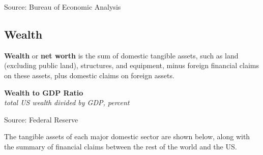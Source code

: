 \documentclass{report}
\makeatletter
\newcommand{\tbllink}[1]{\href{https://raw.githubusercontent.com/bdecon/US-chartbook/master/chartbook/data/#1}{\faTable}}
\newcommand*\short[1]{\expandafter\@gobbletwo\number\numexpr#1\relax}
\newcommand{\sbar}[4]{
		\addplot[ybar stacked, bar width=2.3pt, draw opacity=0, fill=#1] 
			table [x=#2, y=#3, col sep=comma]{#4};}
\newcommand{\absnode}[3]{\node[below right, align=left] at (axis cs: #1,#2) {#3};}
\newcommand{\dateaxisticks}{
		date coordinates in=x, axis line style={draw=none},
		xmax={2023-10-01},
		max space between ticks=40,	    
		xtick={{1990-01-01}, {1992-01-01}, {1994-01-01}, 
			{1996-01-01}, {1998-01-01}, {2000-01-01}, 
			{2002-01-01}, {2004-01-01}, {2006-01-01},
			{2008-01-01}, {2010-01-01}, {2012-01-01}, {2014-01-01},
		    {2016-01-01}, {2018-01-01}, {2020-01-01}, {2022-01-01}, 
		    {2024-01-01}, {2026-01-01}},
		minor xtick={{1989-01-01}, {1991-01-01}, {1993-01-01},
			{1995-01-01}, {1997-01-01}, {1999-01-01}, 
			{2001-01-01}, {2003-01-01}, {2005-01-01}, {2007-01-01},
		    {2009-01-01}, {2011-01-01}, {2013-01-01}, {2015-01-01},
		    {2017-01-01}, {2019-01-01}, {2021-01-01}, {2023-01-01}, 
		    {2025-01-01}, {2027-01-01}},
		enlarge y limits={0.06}, enlarge x limits={0.01},
		}
\newcommand{\bbar}[2]{extra #1 ticks = {{#2}}, extra #1 tick labels = ,
		extra #1 tick style = {grid=major, grid style={thick, black!25}},}
\newcommand{\rbars}{
		\fill[color=black!10] (axis cs:{1990-07-01},\pgfkeysvalueof{/pgfplots/ymin}) rectangle 
			(axis cs:{1991-03-01}, \pgfkeysvalueof{/pgfplots/ymax});
		\fill[color=black!10] (axis cs:{2007-12-01},\pgfkeysvalueof{/pgfplots/ymin}) rectangle 
			(axis cs:{2009-07-01}, \pgfkeysvalueof{/pgfplots/ymax});
		\fill[color=black!10] (axis cs:{2001-03-01},\pgfkeysvalueof{/pgfplots/ymin}) rectangle 
			(axis cs:{2001-11-01}, \pgfkeysvalueof{/pgfplots/ymax});
		\fill[color=black!10] (axis cs:{2020-02-01},\pgfkeysvalueof{/pgfplots/ymin}) rectangle 
			(axis cs:{2020-05-01}, \pgfkeysvalueof{/pgfplots/ymax});}
\makeatother
\begin{document}
{\begin{minipage}{0.76\textwidth}
\footnotesize{Source: Bureau of Economic Analysis} \hfill \tbllink{sectbal2.csv}
\end{minipage}
\newpage
\vspace*{-10mm}

\begin{minipage}{0.76\textwidth}
\subsection*{Wealth} 
\hypertarget{ofw}{\label{ofw}}
\small \textbf{Wealth} or \textbf{net worth} is the sum of domestic tangible assets, such as land (excluding public land), structures, and equipment, minus foreign financial claims on these assets, plus domestic claims on foreign assets.   


\vspace{1mm}

\normalsize \textbf{Wealth to GDP Ratio}\\
\footnotesize{\textit{total US wealth divided by GDP, percent}}
\vspace{3.0cm}

\hspace{4mm} 

\footnotesize{Source: Federal Reserve} \hfill \tbllink{wealthgdp.csv}
\vspace{2mm}

\small The tangible assets of each major domestic sector are shown below, along with the summary of financial claims between the rest of the world and the US.
\vspace{1mm}


\end{minipage}}
\end{document}
